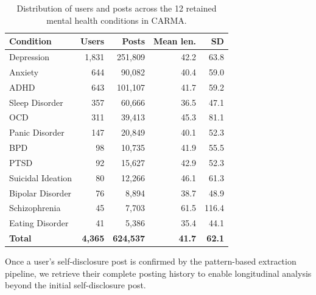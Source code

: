 \documentclass[letterpaper]{article} %
\begin{document}
\begin{table}[h]
\centering
\small
\begin{tabular}{lrrrr}
\toprule
\textbf{Condition} & \textbf{Users} & \textbf{Posts} & \textbf{Mean len.} & \textbf{SD} \\
\midrule
Depression          & 1,831 & 251,809 & 42.2 & 63.8 \\
Anxiety             &   644 &  90,082 & 40.4 & 59.0 \\
ADHD                &   643 & 101,107 & 41.7 & 59.2 \\
Sleep Disorder      &   357 &  60,666 & 36.5 & 47.1 \\
OCD                 &   311 &  39,413 & 45.3 & 81.1 \\
Panic Disorder      &   147 &  20,849 & 40.1 & 52.3 \\
BPD                 &    98 &  10,735 & 41.9 & 55.5 \\
PTSD                &    92 &  15,627 & 42.9 & 52.3 \\
Suicidal Ideation   &    80 &  12,266 & 46.1 & 61.3 \\
Bipolar Disorder    &    76 &   8,894 & 38.7 & 48.9 \\
Schizophrenia       &    45 &   7,703 & 61.5 & 116.4 \\
Eating Disorder     &    41 &   5,386 & 35.4 & 44.1 \\
\midrule
\textbf{Total} & \textbf{4,365} & \textbf{624,537} & \textbf{41.7} & \textbf{62.1} \\
\bottomrule
\end{tabular}
\caption{Distribution of users and posts across the 12 retained mental
health conditions in CARMA.}
\label{tab:corpus_summary}
\end{table}


Once a user's self-disclosure post is confirmed by the pattern-based extraction pipeline, we retrieve their complete posting history to enable longitudinal analysis beyond the initial self-disclosure post.
\end{document}
